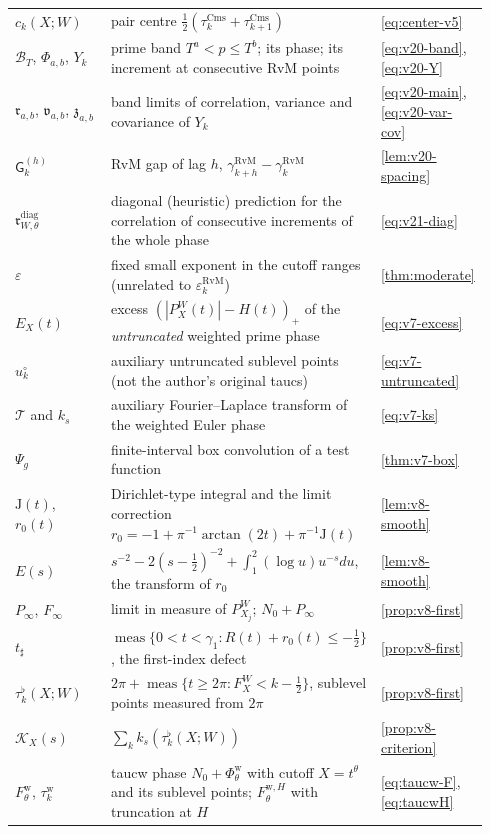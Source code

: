 \documentclass[11pt,a4paper]{article}
\numberwithin{equation}{section}
\theoremstyle{definition}
\theoremstyle{remark}
\newcommand{\meas}{\operatorname{meas}}
\newcommand{\Cms}{\mathrm{Cms}}
\begin{document}
\begin{longtable}{@{}p{0.22\linewidth}p{0.56\linewidth}p{0.16\linewidth}@{}}
$c_k(X;W)$ & pair centre $\frac12(\tau_k^{\Cms}+\tau_{k+1}^{\Cms})$ & \eqref{eq:center-v5}\\
$\mathcal B_T$, $\Phi_{a,b}$, $Y_k$ & prime band $T^a<p\le T^b$; its phase; its increment at consecutive RvM points & \eqref{eq:v20-band}, \eqref{eq:v20-Y}\\
$\mathfrak r_{a,b}$, $\mathfrak v_{a,b}$, $\mathfrak z_{a,b}$ & band limits of correlation, variance and covariance of $Y_k$ & \eqref{eq:v20-main}, \eqref{eq:v20-var-cov}\\
$\mathsf G_k^{(h)}$ & RvM gap of lag $h$, $\gamma_{k+h}^{\mathrm{RvM}}-\gamma_k^{\mathrm{RvM}}$ & \cref{lem:v20-spacing}\\
$\mathfrak r^{\mathrm{diag}}_{W,\theta}$ & diagonal (heuristic) prediction for the correlation of consecutive increments of the whole phase & \eqref{eq:v21-diag}\\
$\varepsilon$ & fixed small exponent in the cutoff ranges (unrelated to $\varepsilon_k^{\mathrm{RvM}}$) & \cref{thm:moderate}\\
$E_X(t)$ & excess $(|P_X^W(t)|-H(t))_+$ of the \emph{untruncated} weighted prime phase & \eqref{eq:v7-excess}\\
$u_k^\circ$ & auxiliary untruncated sublevel points (not the author's original taucs) & \eqref{eq:v7-untruncated}\\
$\mathcal T$ and $k_s$ & auxiliary Fourier--Laplace transform of the weighted Euler phase & \eqref{eq:v7-ks}\\
$\Psi_g$ & finite-interval box convolution of a test function & \cref{thm:v7-box}\\
$\mathrm J(t)$, $r_0(t)$ & Dirichlet-type integral and the limit correction $r_0=-1+\pi^{-1}\arctan(2t)+\pi^{-1}\mathrm J(t)$ & \cref{lem:v8-smooth}\\
$E(s)$ & $s^{-2}-2(s-\frac12)^{-2}+\int_1^2(\log u)u^{-s}du$, the transform of $r_0$ & \cref{lem:v8-smooth}\\
$P_\infty$, $F_\infty$ & limit in measure of $P_{X_j}^W$; $N_0+P_\infty$ & \cref{prop:v8-first}\\
$t_\sharp$ & $\meas\{0<t<\gamma_1:R(t)+r_0(t)\le-\frac12\}$, the first-index defect & \cref{prop:v8-first}\\
$\tau_k^\flat(X;W)$ & $2\pi+\meas\{t\ge2\pi:F_X^W<k-\frac12\}$, sublevel points measured from $2\pi$ & \cref{prop:v8-first}\\
$\mathcal K_X(s)$ & $\sum_k k_s(\tau_k^\flat(X;W))$ & \cref{prop:v8-criterion}\\
$F^{\mathrm w}_\theta$, $\tau_k^{\mathrm w}$ & taucw phase $N_0+\Phi^{\mathrm w}_\theta$ with cutoff $X=t^\theta$ and its sublevel points; $F^{\mathrm w,H}_\theta$ with truncation at $H$ & \eqref{eq:taucw-F}, \eqref{eq:taucwH}\\

\end{longtable}
\end{document}
